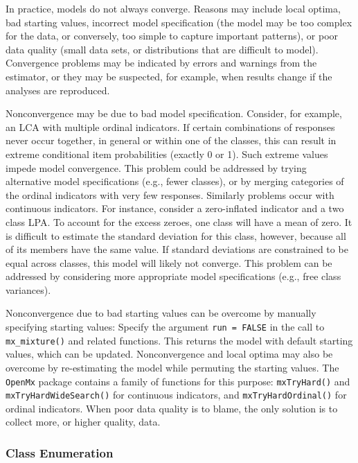 \documentclass[
  ,man,floatsintext]{apa6}
\begin{document}
In practice, models do not always converge.
Reasons may include local optima,
bad starting values,
incorrect model specification (the model may be too complex for the data, or conversely, too simple to capture important patterns),
or poor data quality (small data sets, or distributions that are difficult to model).
Convergence problems may be indicated by errors and warnings from the estimator,
or they may be suspected, for example,
when results change if the analyses are reproduced.

Nonconvergence may be due to bad model specification.
Consider, for example, an LCA with multiple ordinal indicators.
If certain combinations of responses never occur together,
in general or within one of the classes,
this can result in extreme conditional item probabilities (exactly 0 or 1).
Such extreme values impede model convergence.
This problem could be addressed by trying alternative model specifications (e.g., fewer classes),
or by merging categories of the ordinal indicators with very few responses.
Similarly problems occur with continuous indicators.
For instance, consider a zero-inflated indicator and a two class LPA.
To account for the excess zeroes, one class will have a mean of zero.
It is difficult to estimate the standard deviation for this class, however, because all of its members have the same value.
If standard deviations are constrained to be equal across classes,
this model will likely not converge.
This problem can be addressed by considering more appropriate model specifications (e.g., free class variances).

Nonconvergence due to bad starting values
can be overcome by manually specifying starting values:
Specify the argument \texttt{run\ =\ FALSE} in the call to \texttt{mx\_mixture()} and related functions.
This returns the model with default starting values, which can be updated.
Nonconvergence and local optima may also be overcome by re-estimating the model while permuting the starting values.
The \texttt{OpenMx} package contains a family of functions for this purpose: \texttt{mxTryHard()} and \texttt{mxTryHardWideSearch()} for continuous indicators, and \texttt{mxTryHardOrdinal()} for ordinal indicators.
When poor data quality is to blame, the only solution is to collect more, or higher quality, data.

\hypertarget{class-enumeration}{%
\subsubsection{Class Enumeration}\label{class-enumeration}}
\end{document}
